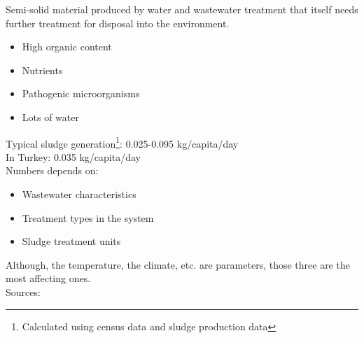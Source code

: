 \documentclass[12pt]{article}
\begin{document}
Semi-solid material produced by water and wastewater treatment that itself needs further treatment for disposal into the environment.
\begin{itemize}
    \item High organic content
    \item Nutrients
    \item Pathogenic microorganisms
    \item Lots of water
\end{itemize}
Typical sludge generation\footnote{Calculated using census data and sludge production data}: 0.025-0.095 kg/capita/day\\
In Turkey: 0.035 kg/capita/day\\
Numbers depends on:
\begin{itemize}
    \item Wastewater characteristics
    \item Treatment types in the system
    \item Sludge treatment units
\end{itemize}
Although, the temperature, the climate, etc. are parameters, those three are the most affecting ones.\\
Sources:
\end{document}
